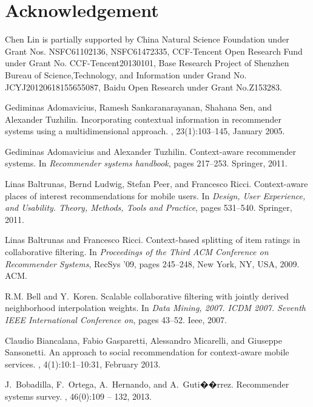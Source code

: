 \documentclass[sigconf]{acmart}
\begin{document}
\section{Acknowledgement}
Chen Lin is partially supported by  China Natural Science Foundation under Grant Nos. NSFC61102136, NSFC61472335, CCF-Tencent Open Research Fund under Grant No. CCF-Tencent20130101, Base Research Project of Shenzhen Bureau of Science,Technology, and Information under Grand No. JCYJ20120618155655087, Baidu Open Research under Grant No.Z153283.

\begin{thebibliography}{10}

Gediminas Adomavicius, Ramesh Sankaranarayanan, Shahana Sen, and Alexander
  Tuzhilin.
\newblock Incorporating contextual information in recommender systems using a
  multidimensional approach.
, 23(1):103--145, January 2005.

Gediminas Adomavicius and Alexander Tuzhilin.
\newblock Context-aware recommender systems.
\newblock In {\em Recommender systems handbook}, pages 217--253. Springer,
  2011.

Linas Baltrunas, Bernd Ludwig, Stefan Peer, and Francesco Ricci.
\newblock Context-aware places of interest recommendations for mobile users.
\newblock In {\em Design, User Experience, and Usability. Theory, Methods,
  Tools and Practice}, pages 531--540. Springer, 2011.

Linas Baltrunas and Francesco Ricci.
\newblock Context-based splitting of item ratings in collaborative filtering.
\newblock In {\em Proceedings of the Third ACM Conference on Recommender
  Systems}, RecSys '09, pages 245--248, New York, NY, USA, 2009. ACM.

R.M. Bell and Y.~Koren.
\newblock Scalable collaborative filtering with jointly derived neighborhood
  interpolation weights.
\newblock In {\em Data Mining, 2007. ICDM 2007. Seventh IEEE International
  Conference on}, pages 43--52. Ieee, 2007.

Claudio Biancalana, Fabio Gasparetti, Alessandro Micarelli, and Giuseppe
  Sansonetti.
\newblock An approach to social recommendation for context-aware mobile
  services.
, 4(1):10:1--10:31, February
  2013.

J.~Bobadilla, F.~Ortega, A.~Hernando, and A.~Guti��rrez.
\newblock Recommender systems survey.
, 46(0):109 -- 132, 2013.


\end{thebibliography}
\end{document}
